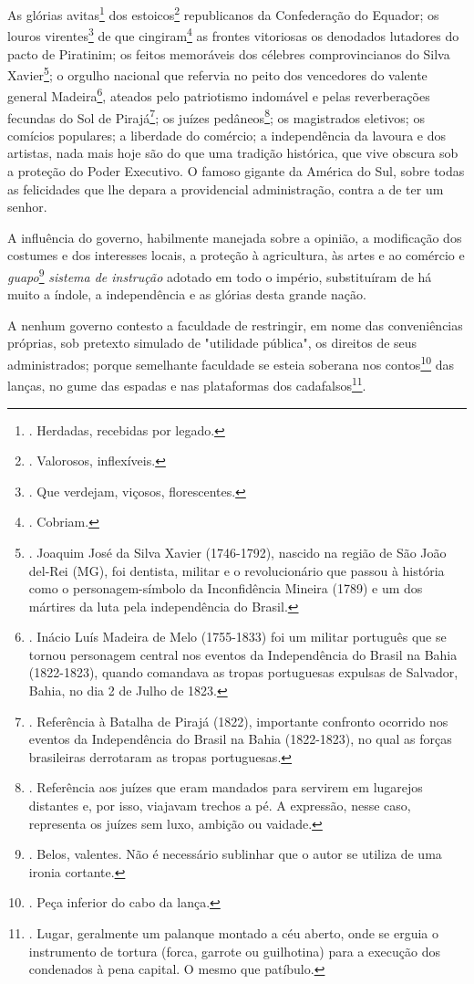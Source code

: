 As glórias avitas\footnote{. Herdadas, recebidas por legado.} dos
estoicos\footnote{. Valorosos, inflexíveis.} republicanos da
Confederação do Equador; os louros virentes\footnote{. Que verdejam,
  viçosos, florescentes.} de que cingiram\footnote{. Cobriam.} as
frontes vitoriosas os denodados lutadores do pacto de Piratinim; os
feitos memoráveis dos célebres comprovincianos do Silva
Xavier\footnote{. Joaquim José da Silva Xavier (1746-1792), nascido na
  região de São João del-Rei (MG), foi dentista, militar e o
  revolucionário que passou à história como o personagem-símbolo da
  Inconfidência Mineira (1789) e um dos mártires da luta pela
  independência do Brasil.}; o orgulho nacional que refervia no peito
dos vencedores do valente general Madeira\footnote{. Inácio Luís Madeira
  de Melo (1755-1833) foi um militar português que se tornou personagem
  central nos eventos da Independência do Brasil na Bahia (1822-1823),
  quando comandava as tropas portuguesas expulsas de Salvador, Bahia, no
  dia 2 de Julho de 1823.}, ateados pelo patriotismo indomável e pelas
reverberações fecundas do Sol de Pirajá\footnote{. Referência à Batalha
  de Pirajá (1822), importante confronto ocorrido nos eventos da
  Independência do Brasil na Bahia (1822-1823), no qual as forças
  brasileiras derrotaram as tropas portuguesas.}; os juízes
pedâneos\footnote{. Referência aos juízes que eram mandados para
  servirem em lugarejos distantes e, por isso, viajavam trechos a pé. A
  expressão, nesse caso, representa os juízes sem luxo, ambição ou
  vaidade.}; os magistrados eletivos; os comícios populares; a liberdade
do comércio; a independência da lavoura e dos artistas, nada mais hoje
são do que uma tradição histórica, que vive obscura sob a proteção do
Poder Executivo. O famoso gigante da América do Sul, sobre todas as
felicidades que lhe depara a providencial administração, contra a de ter
um senhor.

A influência do governo, habilmente manejada sobre a opinião, a
modificação dos costumes e dos interesses locais, a proteção à
agricultura, às artes e ao comércio e \emph{guapo}\footnote{. Belos,
  valentes. Não é necessário sublinhar que o autor se utiliza de uma
  ironia cortante.} \emph{sistema de instrução} adotado em todo o
império, substituíram de há muito a índole, a independência e as glórias
desta grande nação.

A nenhum governo contesto a faculdade de restringir, em nome das
conveniências próprias, sob pretexto simulado de "utilidade pública", os
direitos de seus administrados; porque semelhante faculdade se esteia
soberana nos contos\footnote{. Peça inferior do cabo da lança.} das
lanças, no gume das espadas e nas plataformas dos cadafalsos\footnote{.
  Lugar, geralmente um palanque montado a céu aberto, onde se erguia o
  instrumento de tortura (forca, garrote ou guilhotina) para a execução
  dos condenados à pena capital. O mesmo que patíbulo.}.

